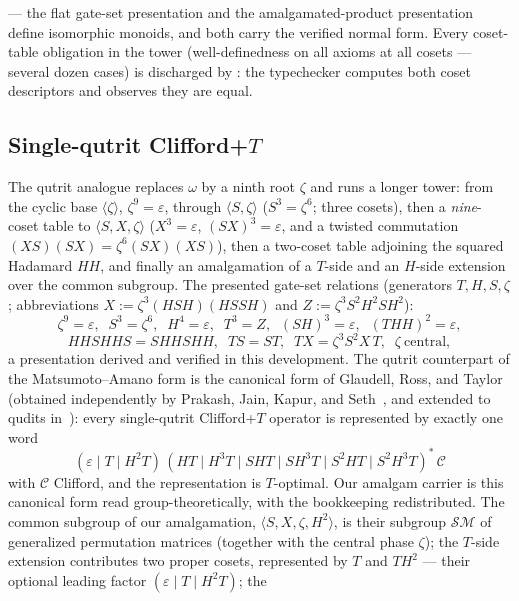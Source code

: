 --- the flat gate-set presentation and the amalgamated-product
presentation define isomorphic monoids, and both carry the verified
normal form.  Every coset-table obligation in the tower (well-definedness
on all axioms at all cosets --- several dozen cases) is discharged by
: the typechecker computes both coset
descriptors and observes they are equal.

\subsection{Single-qutrit Clifford+$T$}

The qutrit analogue replaces $\omega$ by a ninth root $\zeta$ and runs a
longer tower: from the cyclic base $\langle \zeta \rangle$,
$\zeta^9 = \varepsilon$, through
$\langle S, \zeta \rangle$ ($S^3 = \zeta^6$; three cosets), then a
\emph{nine}-coset table to $\langle S, X, \zeta \rangle$
($X^3 = \varepsilon$, $(SX)^3 = \varepsilon$, and a twisted commutation
$(XS)(SX) = \zeta^6 (SX)(XS)$), then a two-coset table adjoining the
squared Hadamard $H\!H$, and finally an amalgamation of a $T$-side and an
$H$-side extension over the common subgroup.  The presented gate-set
relations (generators $T, H, S, \zeta$; abbreviations
$X := \zeta^3 (HSH)(HSSH)$ and $Z := \zeta^3 S^2 H^2 S H^2$):
\[
  \zeta^9 = \varepsilon,\;\;
  S^3 = \zeta^6,\;\;
  H^4 = \varepsilon,\;\;
  T^3 = Z,\;\;
  (SH)^3 = \varepsilon,\;\;
  (THH)^2 = \varepsilon,
\]
\[
  HHSHHS = SHHSHH,\;\;
  TS = ST,\;\;
  TX = \zeta^3 S^2 X\, T,\;\;
  \zeta\ \text{central},
\]
a presentation derived and verified in this development.  The qutrit
counterpart of the Matsumoto--Amano form is the canonical form of
Glaudell, Ross, and Taylor~\cite{glaudell2019qutrit} (obtained
independently by Prakash, Jain, Kapur, and
Seth~\cite{prakash2018qutrit}, and extended to qudits
in~\cite{jain2020qudit}): every single-qutrit Clifford+$T$ operator is
represented by exactly one word
\[
  (\varepsilon \mid T \mid H^2T)\,
  (HT \mid H^3T \mid SHT \mid SH^3T \mid S^2HT \mid S^2H^3T)^{*}\,
  \mathcal{C}
\]
with $\mathcal{C}$ Clifford, and the representation is $T$-optimal.
Our amalgam carrier is this canonical form read group-theoretically,
with the bookkeeping redistributed.  The common subgroup of our
amalgamation, $\langle S, X, \zeta, H^2 \rangle$, is their subgroup
$\mathcal{S}\mathcal{M}$ of generalized permutation matrices
(together with the central phase $\zeta$); the $T$-side extension
contributes two proper cosets, represented by $T$ and $TH^2$ ---
their optional leading factor $(\varepsilon \mid T \mid H^2T)$; the
